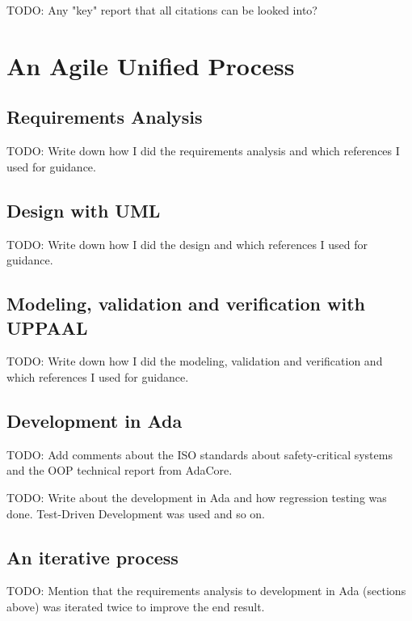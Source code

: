 TODO: Any "key" report that all citations can be looked into?

\section{An Agile Unified Process}
\subsection{Requirements Analysis}
TODO: Write down how I did the requirements analysis and which references I
used for guidance.

\subsection{Design with UML}
TODO: Write down how I did the design and which references I used for guidance.

\subsection{Modeling, validation and verification with UPPAAL}
TODO: Write down how I did the modeling, validation and verification and which
references I used for guidance.

\subsection{Development in Ada}
TODO: Add comments about the ISO standards about safety-critical systems and
the OOP technical report from AdaCore.

TODO: Write about the development in Ada and how regression testing was done.
Test-Driven Development was used and so on.

\subsection{An iterative process}
TODO: Mention that the requirements analysis to development in Ada (sections
above) was iterated twice to improve the end result.
